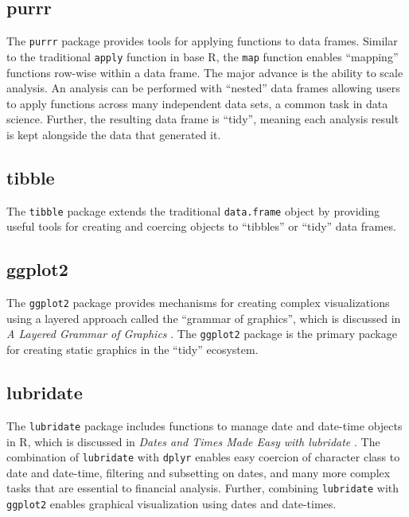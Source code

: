 \subsection{purrr}\label{purrr}

The \texttt{purrr} package provides tools for applying functions to data
frames. Similar to the traditional \texttt{apply} function in base R,
the \texttt{map} function enables ``mapping'' functions row-wise within
a data frame. The major advance is the ability to scale analysis. An
analysis can be performed with ``nested'' data frames allowing users to
apply functions across many independent data sets, a common task in data
science. Further, the resulting data frame is ``tidy'', meaning each
analysis result is kept alongside the data that generated it.

\subsection{tibble}\label{tibble}

The \texttt{tibble} package extends the traditional \texttt{data.frame}
object by providing useful tools for creating and coercing objects to
``tibbles'' or ``tidy'' data frames.

\subsection{ggplot2}\label{ggplot2}

The \texttt{ggplot2} package provides mechanisms for creating complex
visualizations using a layered approach called the ``grammar of
graphics'', which is discussed in \emph{A Layered Grammar of Graphics}
\citep{layered-grammar}. The \texttt{ggplot2} package is the primary
package for creating static graphics in the ``tidy'' ecosystem.

\subsection{lubridate}\label{lubridate}

The \texttt{lubridate} package includes functions to manage date and
date-time objects in R, which is discussed in \emph{Dates and Times Made
Easy with lubridate} \citep{lubridate}. The combination of
\texttt{lubridate} with \texttt{dplyr} enables easy coercion of
character class to date and date-time, filtering and subsetting on
dates, and many more complex tasks that are essential to financial
analysis. Further, combining \texttt{lubridate} with \texttt{ggplot2}
enables graphical visualization using dates and date-times.

